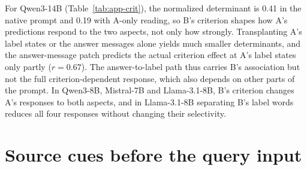 For Qwen3-14B (Table~\ref{tab:app-crit}), the normalized determinant is 0.41 in the native prompt and 0.19 with A-only reading, so B's criterion shapes how A's predictions respond to the two aspects, not only how strongly.
Transplanting A's label states or the answer messages alone yields much smaller determinants, and the answer-message patch predicts the actual criterion effect at A's label states only partly ($r=0.67$).
The answer-to-label path thus carries B's association but not the full criterion-dependent response, which also depends on other parts of the prompt.
In Qwen3-8B, Mistral-7B and Llama-3.1-8B, B's criterion changes A's responses to both aspects, and in Llama-3.1-8B separating B's label words reduces all four responses without changing their selectivity.

\begin{table}[t]
\centering\small
{}
\caption{Criterion-specific responses of A's predictions to B's convention in Qwen3-14B (two-aspect reviews). Mean interaction: average difference in aspect selectivity between B's two criteria.}
\label{tab:app-crit}
\end{table}

\section{Source cues before the query input}
\label{app:cue}

